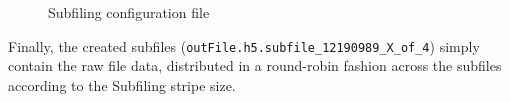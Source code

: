 \documentclass[../main.tex]{subfiles}
\begin{document}
\begin{figure}
\centering
{}
\caption{Subfiling configuration file}
\label{fig:config_file}
\end{figure}

Finally, the created subfiles (\texttt{outFile.h5.subfile\_12190989\_X\_of\_4}) simply contain
the raw file data, distributed in a round-robin fashion across the subfiles according to the Subfiling
stripe size.
 
\end{document}

